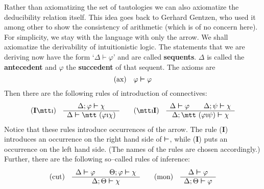 Rather than axiomatizing the set of tautologies we can also axiomatize 
the deducibility relation itself. This idea goes back to Gerhard 
Gentzen, who used it among other to show the consistency of arithmetic 
(which is of no concern here). For simplicity, we stay with the language 
with only the arrow. We shall axiomatize the derivability of intuitionistic 
logic. The statements that we are deriving now have the form 
`$\Delta  \boldsymbol{\vdash} \varphi$' and are called \textbf{sequents}. 
$\Delta$ is called the \textbf{antecedent} and $\varphi$ the 
\textbf{succedent} of that sequent.
The axioms are
\begin{equation}
\mbox{\rm (ax)} \quad \varphi \boldsymbol{\vdash} \varphi
\end{equation}
Then there are the following rules of introduction of connectives:
\begin{equation}
\mbox{\rm (\textbf{I}{\mtt\symbol{25}})}\quad
\begin{array}{c}
    \Delta;\varphi\bvdash\chi\\\hline
    \Delta\bvdash\mbox{\mtt ($\varphi$\symbol{25}$\chi$)}
    \end{array}
\qquad
\mbox{\rm ({\mtt\symbol{25}}\textbf{I})}\quad
\begin{array}{c}
    \Delta\bvdash\varphi \qquad \Delta;\psi\bvdash\chi\\\hline
    \Delta;\mbox{\mtt ($\varphi$\symbol{25}$\psi$)}\bvdash
        \chi
    \end{array}
\end{equation}
Notice that these rules introduce occurrences of the arrow. The
rule (\textbf{I}{\mtt{}}) introduces an occurrence on the 
right hand side of $\boldsymbol{\vdash}$, while ({\mtt{}}\textbf{I}) 
puts an occurrence on the left hand side. (The names of the rules 
are chosen accordingly.) Further, there are the following so--called 
rules of inference:
\begin{equation}
\mbox{\rm (cut)}\quad
\begin{array}{c}
\Delta\boldsymbol{\vdash}\varphi \qquad \Theta;\varphi \boldsymbol{\vdash} \chi \\\hline
\Delta;\Theta \boldsymbol{\vdash}\chi
\end{array}
\qquad
\mbox{\rm (mon)}\quad
\begin{array}{c}
\Delta\boldsymbol{\vdash}\varphi \\\hline
\Delta;\Theta\boldsymbol{\vdash}\varphi
\end{array}
\end{equation}
